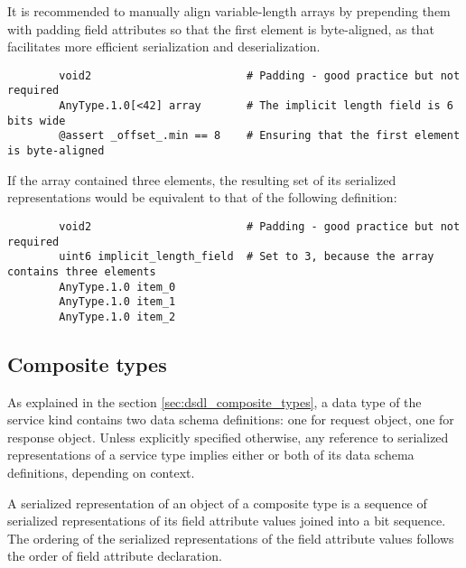 \begin{remark}
    It is recommended to manually align variable-length arrays by prepending them with padding field attributes
    so that the first element is byte-aligned, as that facilitates more efficient serialization and deserialization.

    \begin{verbatim}
        void2                        # Padding - good practice but not required
        AnyType.1.0[<42] array       # The implicit length field is 6 bits wide
        @assert _offset_.min == 8    # Ensuring that the first element is byte-aligned
    \end{verbatim}

    If the array contained three elements,
    the resulting set of its serialized representations would be equivalent to that of the following definition:

    \begin{verbatim}
        void2                        # Padding - good practice but not required
        uint6 implicit_length_field  # Set to 3, because the array contains three elements
        AnyType.1.0 item_0
        AnyType.1.0 item_1
        AnyType.1.0 item_2
    \end{verbatim}
\end{remark}

\subsection{Composite types}

As explained in the section \ref{sec:dsdl_composite_types}, a data type of the service kind contains
two data schema definitions: one for request object, one for response object.
Unless explicitly specified otherwise, any reference to serialized representations of a service type
implies either or both of its data schema definitions, depending on context.

A serialized representation of an object of a composite type is a sequence of serialized representations of
its field attribute values joined into a bit sequence.
The ordering of the serialized representations of the field attribute values follows the order
of field attribute declaration.

